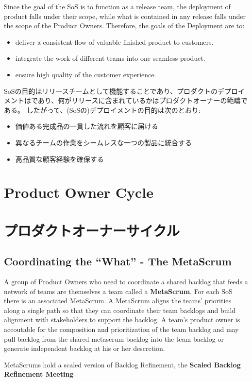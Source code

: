 \documentclass[12pt,a4paper,parskip=full]{scrartcl}
\begin{document}
Since the goal of the SoS is to function as a release team, the deployment
of product falls under their scope, while what is contained in any release
falls under the scope of the Product Owners. Therefore, the goals of the
Deployment are to:
\begin{itemize}
\item deliver a consistent flow of valuable finished product to customers.
\item integrate the work of different teams into one seamless product.
\item ensure high quality of the customer experience.
\end{itemize}
\fi
SoSの目的はリリースチームとして機能することであり、プロダクトのデプロイメントはであり、何がリリースに含まれているかはプロダクトオーナーの範疇である。
したがって、(SoSの)デプロイメントの目的は次のとおり:
\begin{itemize}
\item 価値ある完成品の一貫した流れを顧客に届ける
\item 異なるチームの作業をシームレスな一つの製品に統合する
\item 高品質な顧客経験を確保する
\end{itemize}

\section{Product Owner Cycle}
\fi
\section{プロダクトオーナーサイクル}
\subsection{Coordinating the ``What'' - The MetaScrum}
A group of Product Owners who need to coordinate a shared backlog that
feeds a network of teams are themselves a team called a \textbf{MetaScrum}.
For each SoS there is an associated MetaScrum. A MetaScrum aligns the
teams' priorities along a single path so that they can coordinate their
team backlogs and build alignment with stakeholders to support the backlog.
A team's product owner is accoutable for the composition and prioritization
of the team backlog and may pull backlog from the shared metascrum backlog
into the team backlog or generate independent backlog at his or her descretion.

MetaScrums hold a scaled version of Backlog Refinement, the \textbf{Scaled Backlog Refinement Meeting} 
\fi
\end{document}
